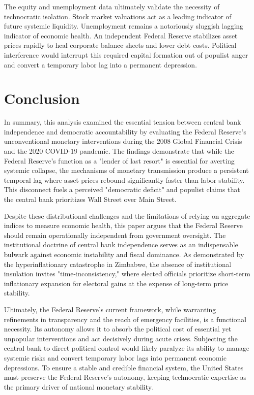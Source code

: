 \documentclass[12pt]{article}
\begin{document}
{} The equity and unemployment data ultimately validate the necessity of technocratic isolation. Stock market valuations act as a leading indicator of future systemic liquidity. Unemployment remains a notoriously sluggish lagging indicator of economic health. An independent Federal Reserve stabilizes asset prices rapidly to heal corporate balance sheets and lower debt costs. Political interference would interrupt this required capital formation out of populist anger and convert a temporary labor lag into a permanent depression.

\section{Conclusion}
{} In summary, this analysis examined the essential tension between central bank independence and democratic accountability by evaluating the Federal Reserve's unconventional monetary interventions during the 2008 Global Financial Crisis and the 2020 COVID-19 pandemic. The findings demonstrate that while the Federal Reserve’s function as a "lender of last resort" is essential for averting systemic collapse, the mechanisms of monetary transmission produce a persistent temporal lag where asset prices rebound significantly faster than labor stability. This disconnect fuels a perceived "democratic deficit" and populist claims that the central bank prioritizes Wall Street over Main Street.

{} Despite these distributional challenges and the limitations of relying on aggregate indices to measure economic health, this paper argues that the Federal Reserve should remain operationally independent from government oversight. The institutional doctrine of central bank independence serves as an indispensable bulwark against economic instability and fiscal dominance. As demonstrated by the hyperinflationary catastrophe in Zimbabwe, the absence of institutional insulation invites "time-inconsistency," where elected officials prioritize short-term inflationary expansion for electoral gains at the expense of long-term price stability.

{} Ultimately, the Federal Reserve’s current framework, while warranting refinements in transparency and the reach of emergency facilities, is a functional necessity. Its autonomy allows it to absorb the political cost of essential yet unpopular interventions and act decisively during acute crises. Subjecting the central bank to direct political control would likely paralyze its ability to manage systemic risks and convert temporary labor lags into permanent economic depressions. To ensure a stable and credible financial system, the United States must preserve the Federal Reserve's autonomy, keeping technocratic expertise as the primary driver of national monetary stability.

\newpage
\printbibliography[title={References}]
\end{document}
